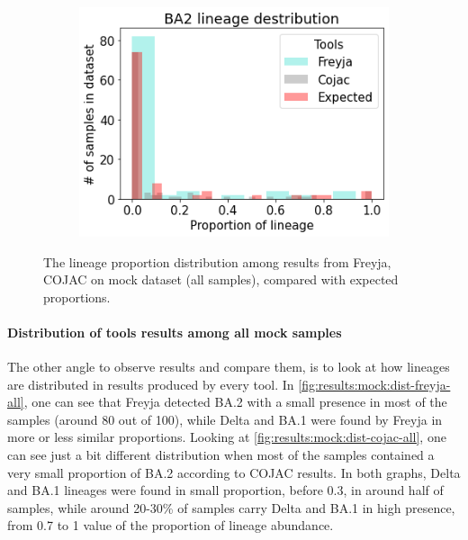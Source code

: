 \begin{figure}[H]
            \hfill
            \begin{subfigure}[b]{0.3\textwidth}
            \includegraphics[width=1\textwidth]{figures/results/mock/distr-ba2.png}
            \label{fig:results:mock:dist-ba1-all}
            \end{subfigure}
            \caption{The lineage proportion distribution among results from Freyja, COJAC on mock dataset (all samples), compared with expected proportions.}
        \end{figure}
        
        \paragraph{Distribution of tools results among all mock samples}
        The other angle to observe results and compare them, is to look at how lineages are distributed in results produced by every tool. In \cref{fig:results:mock:dist-freyja-all}, one can see that Freyja detected BA.2 with a small presence in most of the samples (around 80 out of 100), while Delta and BA.1 were found by Freyja in more or less similar proportions. Looking at \cref{fig:results:mock:dist-cojac-all}, one can see just a bit different distribution when most of the samples contained a very small proportion of BA.2 according to COJAC results. In both graphs, Delta and BA.1 lineages were found in small proportion, before 0.3, in around half of samples, while around 20-30\% of samples carry Delta and BA.1 in high presence, from 0.7 to 1 value of the proportion of lineage abundance.
        
